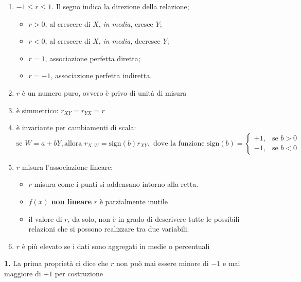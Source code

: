 \documentclass[
  11pt,
]{book}
\providecommand{\tightlist}{%
  \setlength{\itemsep}{0pt}\setlength{\parskip}{0pt}}
\theoremstyle{mytheoremstyle}
\theoremstyle{mydefstyle}
\begin{document}
\begin{info}

\begin{enumerate}
\def\labelenumi{\arabic{enumi}.}
\tightlist
\item
  \(-1 \le r \le 1\). Il segno indica la direzione della relazione;

  \begin{itemize}
  \tightlist
  \item
    \(r>0\), al crescere di \(X\), \emph{in media}, cresce \(Y\);
  \item
    \(r<0\), al crescere di \(X\), \emph{in media}, decresce \(Y\);
  \item
    \(r=1\), associazione perfetta diretta;
  \item
    \(r=-1\), associazione perfetta indiretta.
  \end{itemize}
\item
  \(r\) è un numero puro, ovvero è privo di unità di misura
\item
  è simmetrico: \(r_{XY} = r_{YX} = r\)
\item
  è invariante per cambiamenti di scala:
  \[\text{se }W=a+bY,\text{allora }r_{X,W}=\text{sign}(b) r_{XY},\text{ dove la funzione sign}(b)=
  \begin{cases}+1, &\text{se $b>0$}\\
            -1, &\text{se $b<0$}
  \end{cases}\]
\item
  \(r\) misura l'associazione lineare:

  \begin{itemize}
  \tightlist
  \item
    \(r\) misura come i punti si addensano intorno alla retta.
  \item
    \(f(x)\) \textbf{non lineare} \(r\) è parzialmente inutile
  \item
    il valore di \(r\), da solo, non è in grado di descrivere tutte le possibili relazioni
    che si possono realizzare tra due variabili.
  \end{itemize}
\item
  \(r\) è più elevato se i dati sono aggregati in medie o percentuali
\end{enumerate}

\end{info}

\textbf{1.} La prima proprietà ci dice che \(r\) non può mai essere minore di \(-1\) e mai
maggiore di \(+1\) per costruzione
\end{document}
